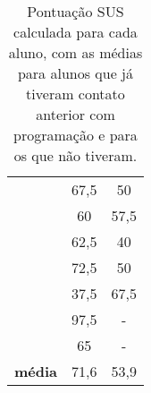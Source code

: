 \begin{table}[h!]
\begin{tabular}{c|c|c|}
                                     & 67,5                                                                                           & 50                                                                                              \\ \cline{2-3} 
                                     & 60                                                                                             & 57,5                                                                                            \\ \cline{2-3} 
                                     & 62,5                                                                                           & 40                                                                                              \\ \cline{2-3} 
                                     & 72,5                                                                                           & 50                                                                                              \\ \cline{2-3} 
                                     & 37,5                                                                                           & 67,5                                                                                            \\ \cline{2-3} 
                                     & 97,5                                                                                           & -                                                                                               \\ \cline{2-3} 
                                     & 65                                                                                             & -                                                                                               \\ \hline
\multicolumn{1}{|c|}{\textbf{média}} & 71,6                                                                                           & 53,9                                                                                            \\ \hline
\end{tabular}
\caption{Pontuação SUS calculada para cada aluno, com as médias para alunos que já tiveram contato anterior com programação e para os que não tiveram.}
\label{table:sus_score}
\end{table}

